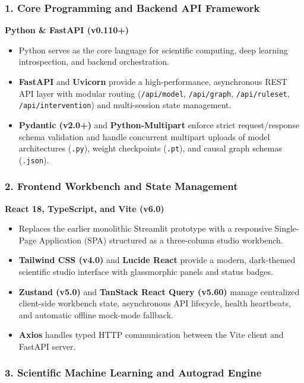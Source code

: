 \documentclass[12pt,singleside,a4paper]{article}
\begin{document}
\subsubsection{1. Core Programming and Backend API Framework}

\textbf{Python \& FastAPI (v0.110+)}
\begin{itemize}
    \item Python serves as the core language for scientific computing, deep learning introspection, and backend orchestration.
    \item \textbf{FastAPI} and \textbf{Uvicorn} provide a high-performance, asynchronous REST API layer with modular routing (\texttt{/api/model}, \texttt{/api/graph}, \texttt{/api/ruleset}, \texttt{/api/intervention}) and multi-session state management.
    \item \textbf{Pydantic (v2.0+)} and \textbf{Python-Multipart} enforce strict request/response schema validation and handle concurrent multipart uploads of model architectures (\texttt{.py}), weight checkpoints (\texttt{.pt}), and causal graph schemas (\texttt{.json}).
\end{itemize}

\subsubsection{2. Frontend Workbench and State Management}

\textbf{React 18, TypeScript, and Vite (v6.0)}
\begin{itemize}
    \item Replaces the earlier monolithic Streamlit prototype with a responsive Single-Page Application (SPA) structured as a three-column studio workbench.
    \item \textbf{Tailwind CSS (v4.0)} and \textbf{Lucide React} provide a modern, dark-themed scientific studio interface with glassmorphic panels and status badges.
    \item \textbf{Zustand (v5.0)} and \textbf{TanStack React Query (v5.60)} manage centralized client-side workbench state, asynchronous API lifecycle, health heartbeats, and automatic offline mock-mode fallback.
    \item \textbf{Axios} handles typed HTTP communication between the Vite client and FastAPI server.
\end{itemize}

\subsubsection{3. Scientific Machine Learning and Autograd Engine}
\end{document}
